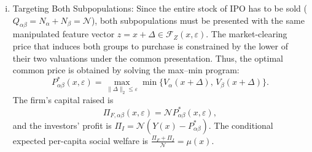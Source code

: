 \begin{enumerate}[(i)]
\item Targeting Both Subpopulations: Since the entire stock of IPO has to be sold ($Q_{\alpha\beta} = N_\alpha + N_\beta = \mathcal{N}$), both subpopulations must be presented with the same manipulated feature vector $z = x + \Delta \in \mathcal{F}_Z(x, \varepsilon)$. The market-clearing price that induces both groups to purchase is constrained by the lower of their two valuations under the common presentation. Thus, the optimal common price is obtained by solving the max--min program:
  \begin{equation}
  \label{eq:p_alphabeta_simple}
  P_{\alpha\beta}^*(x, \varepsilon) = \max_{\|\Delta\|_2 \le \varepsilon} \min\bigl\{V_\alpha(x + \Delta),\, V_\beta(x + \Delta)\bigr\}.
  \end{equation}
  The firm's capital raised is
  \begin{equation}
  \Pi_{F,\alpha\beta}(x, \varepsilon) = \mathcal{N} P_{\alpha\beta}^*(x, \varepsilon),
  \end{equation}
  and the investors' profit is $\Pi_{I} = \mathcal{N}(Y(x) - P_{\alpha\beta}^*)$. The conditional expected per-capita social welfare is $\frac{\Pi_F + \Pi_{I}}{\mathcal{N}} = \mu(x)$.
\end{enumerate}

